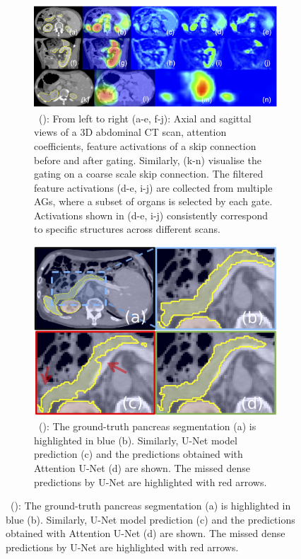 \documentclass{article}
\newcommand\newsubcap[1]{\phantomcaption%
	\caption*{\figurename~\thefigure(\thesubfigure): #1}}
\begin{document}
\begin{figure}[t]
	\centering
	\begin{subfigure}{0.628\linewidth}
		\centering
		\includegraphics[width=1.00\textwidth]{figure1_a.png}
		\newsubcap{From left to right (a-e, f-j): Axial and sagittal views of a 3D abdominal CT scan, attention coefficients, feature activations of a skip connection before and after gating. Similarly, (k-n) visualise the gating on a coarse scale skip connection. The filtered feature activations (d-e, i-j) are collected from multiple AGs, where a subset of organs is selected by each gate. Activations shown in (d-e, i-j) consistently correspond to specific structures across different scans.}
		\label{fig:attention_activations}
	\end{subfigure}
	\hfill
	\begin{subfigure}{0.360\linewidth}
		\centering
		\includegraphics[width=1.00\textwidth]{figure1_b.png}
		\newsubcap{The ground-truth pancreas segmentation (a) is highlighted in blue (b). Similarly, U-Net model prediction (c) and the predictions obtained with Attention U-Net (d) are shown. The missed dense predictions by U-Net are highlighted with red arrows.}
		\label{fig:qualitative_comparison}
	\end{subfigure}
\end{figure}
\end{document}

